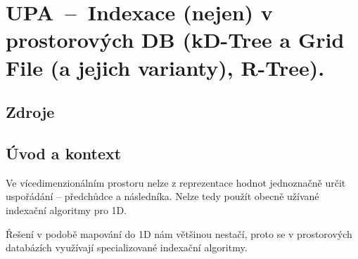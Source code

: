 

\graphicspath{{upa/prostorove_db_indexace/figures}}


\chapter{UPA~--~Indexace (nejen) v prostorových DB (kD-Tree a Grid File (a jejich varianty), R-Tree).}


\section{Zdroje}

\begin{compactitem}
    \item {}
    \item {}
    \item {}
    \item {}
\end{compactitem}


\section{Úvod a kontext}

\begin{compactitem}
    \item Ve vícedimenzionálním prostoru nelze z reprezentace hodnot jednoznačně určit uspořádání -- předchůdce a následníka. Nelze tedy použít obecně užívané indexační algoritmy pro 1D.

    \item Řešení v podobě mapování do 1D nám většinou nestačí, proto se v prostorových databázích využívají specializované indexační algoritmy.
\end{compactitem}


